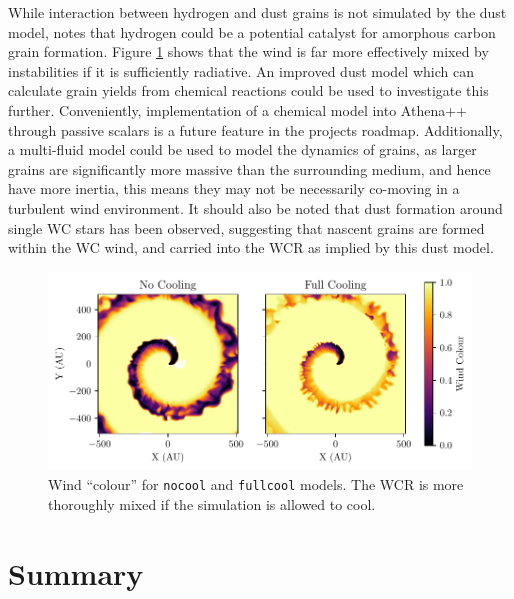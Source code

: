 \documentclass[fleqn,usenatbib]{mnras}
\begin{document}
While interaction between hydrogen and dust grains is not simulated by the dust model, \cite{leteuffModelDustFormation2002} notes that hydrogen could be a potential catalyst for amorphous carbon grain formation.
Figure \ref{fig:radiative-windmixing} shows that the wind is far more effectively mixed by instabilities if it is sufficiently radiative.
An improved dust model which can calculate grain yields from chemical reactions could be used to investigate this further.
Conveniently, implementation of a chemical model into Athena++ through passive scalars is a future feature in the projects roadmap.
Additionally, a multi-fluid model could be used to model the dynamics of grains, as larger grains are significantly more massive than the surrounding medium, and hence have more inertia, this means they may not be necessarily co-moving in a turbulent wind environment.
It should also be noted that dust formation around single WC stars has been observed, suggesting that nascent grains are formed within the WC wind, and carried into the WCR as implied by this dust model.

\begin{figure}
  \centering
  \includegraphics[width=\linewidth]{assets/results/radiative/radiative-r0.pdf}
  \caption[Wind mixing due to radiative methods]{Wind ``colour'' for \texttt{nocool} and \texttt{fullcool} models. The WCR is more thoroughly mixed if the simulation is allowed to cool.}
  \label{fig:radiative-windmixing}
\end{figure}

\section{Summary}
\end{document}
